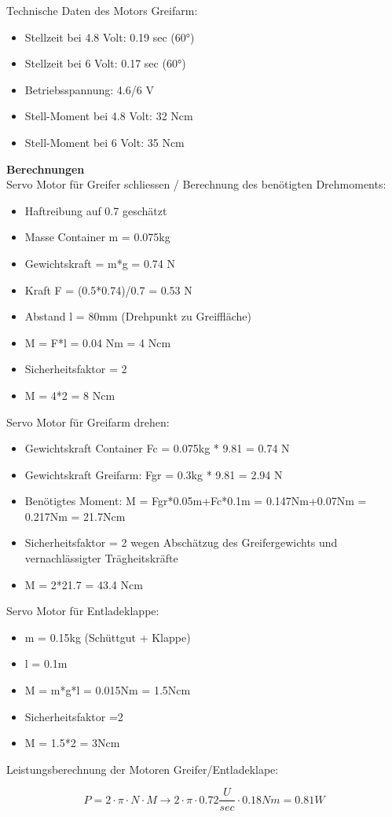 Technische Daten des Motors Greifarm:
\begin{itemize}
\item Stellzeit bei 4.8 Volt: 0.19 sec (60°) 
\item Stellzeit bei 6 Volt: 0.17 sec (60°) 
\item Betriebsspannung: 4.6/6 V
\item Stell-Moment bei 4.8 Volt: 32 Ncm 
\item Stell-Moment bei 6 Volt: 35 Ncm 
\end{itemize}

\textbf{Berechnungen}
\\[0.2cm]
Servo Motor für Greifer schliessen /
Berechnung des benötigten Drehmoments: 
\begin{itemize}
\item Haftreibung auf 0.7 geschätzt
\item Masse Container m = 0.075kg
\item Gewichtskraft = m*g = 0.74 N
\item Kraft F = (0.5*0.74)/0.7 = 0.53 N
\item Abstand l = 80mm (Drehpunkt zu Greiffläche)
\item M = F*l = 0.04 Nm = 4 Ncm
\item Sicherheitsfaktor = 2
\item M = 4*2 = 8 Ncm
\end{itemize}

Servo Motor für Greifarm drehen:
\begin{itemize}
\item Gewichtskraft Container Fc = 0.075kg * 9.81 = 0.74 N
\item Gewichtskraft Greifarm: Fgr = 0.3kg * 9.81 = 2.94 N
\item Benötigtes Moment:
M = Fgr*0.05m+Fc*0.1m = 0.147Nm+0.07Nm = 0.217Nm = 21.7Ncm
\item Sicherheitsfaktor = 2 wegen Abschätzug des Greifergewichts und vernachlässigter Trägheitskräfte
\item M = 2*21.7 = 43.4 Ncm
\end{itemize}

Servo Motor für Entladeklappe:
\begin{itemize}
\item m = 0.15kg (Schüttgut + Klappe)
\item l = 0.1m
\item M = m*g*l = 0.015Nm = 1.5Ncm
\item Sicherheitsfaktor =2
\item M = 1.5*2 = 3Ncm
\end{itemize}

Leistungsberechnung der Motoren Greifer/Entladeklape:
\begin{itemize}
\[
P=2\cdot \pi\cdot N\cdot M \to 2\cdot \pi\cdot 0.72\frac{U}{sec}\cdot 0.18Nm = 0.81W
\]
\end{itemize}